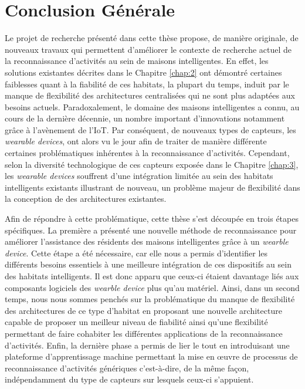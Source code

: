 \chapter{Conclusion Générale}
\label{chap:conclusion}

Le projet de recherche présenté dans cette thèse propose, de manière originale, de nouveaux travaux qui permettent d'améliorer le contexte de recherche actuel de la reconnaissance d'activités au sein de maisons intelligentes. En effet, les solutions existantes décrites dans le Chapitre \ref{chap:2} ont démontré certaines faiblesses quant à la fiabilité de ces habitats, la plupart du temps, induit par le manque de flexibilité des architectures centralisées qui ne sont plus adaptées aux besoins actuels. Paradoxalement, le domaine des maisons intelligentes a connu, au cours de la dernière décennie, un nombre important d'innovations notamment grâce à l'avènement de l'\acs{IoT}. Par conséquent, de nouveaux types de capteurs, les \textit{wearable devices}, ont alors vu le jour afin de traiter de manière différente certaines problématiques inhérentes à la reconnaissance d'activités. Cependant, selon la diversité technologique de ces capteurs exposée dans le Chapitre \ref{chap:3}, les \textit{wearable devices} souffrent d'une intégration limitée au sein des habitats intelligents existants illustrant de nouveau, un problème majeur de flexibilité dans la conception de des architectures existantes.

Afin de répondre à cette problématique, cette thèse s'est découpée en trois étapes spécifiques. La première a présenté une nouvelle méthode de reconnaissance pour améliorer l'assistance des résidents des maisons intelligentes grâce à un \textit{wearble device}. Cette étape a été nécessaire, car elle nous a permis d'identifier les différents besoins essentiels à une meilleure intégration de ces dispositifs au sein des habitats intelligents. Il est donc apparu que ceux-ci étaient davantage liés aux composants logiciels des \textit{wearble device} plus qu'au matériel. Ainsi, dans un second temps, nous nous sommes penchés sur la problématique du manque de flexibilité des architectures de ce type d'habitat en proposant une nouvelle architecture capable de proposer un meilleur niveau de fiabilité ainsi qu'une flexibilité permettant de faire cohabiter les différentes applications de la reconnaissance d'activités. Enfin, la dernière phase a permis de lier le tout en introduisant une plateforme d'apprentissage machine permettant la mise en \oe{}uvre  de processus de reconnaissance d'activités génériques c'est-à-dire, de la même façon, indépendamment du type de capteurs sur lesquels ceux-ci s'appuient.

